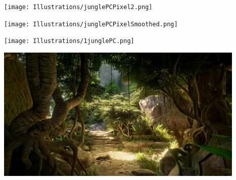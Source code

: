 \documentclass{beamer}
\begin{document}
\begin{frame}

  \begin{center}
    \texttt{[image: Illustrations/junglePCPixel2.png]}
  \end{center}
  
\end{frame}

\begin{frame}

  \begin{center}
    \texttt{[image: Illustrations/junglePCPixelSmoothed.png]}
  \end{center}
  
\end{frame}


\begin{frame}

  \begin{center}
    \texttt{[image: Illustrations/1junglePC.png]}
  \end{center}
  
\end{frame}

\begingroup


\begin{frame}

  \begin{center}
    \includegraphics[width=4.7in]{Illustrations/jungle.jpg}
    \\
  \end{center}
  
\end{frame}

\endgroup
\end{document}

